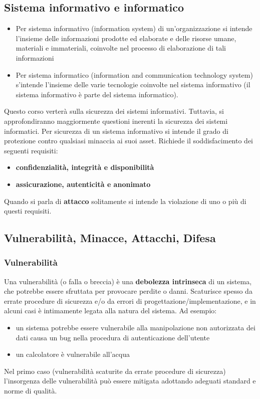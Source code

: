 \subsection{Sistema informativo e informatico}
\begin{itemize} 
  \item Per sistema informativo (information system) di un’organizzazione si intende l’insieme delle informazioni prodotte ed elaborate e delle risorse umane, materiali e immateriali, coinvolte nel processo di elaborazione di tali informazioni
  \item Per sistema informatico (information and communication technology system) s'intende l'insieme delle varie tecnologie coinvolte nel sistema informativo (il sistema informativo è parte del sistema informatico).
\end{itemize}
Questo corso verterà sulla sicurezza dei sistemi informativi. Tuttavia, si approfondiranno maggiormente questioni inerenti la sicurezza
dei sistemi informatici. Per sicurezza di un sistema informativo si intende il grado di protezione contro qualsiasi minaccia ai suoi asset.
Richiede il soddisfacimento dei seguenti requisiti:
\begin{itemize} 
  \item \textbf{confidenzialità, integrità e disponibilità}
  \item \textbf{assicurazione, autenticità e anonimato}
\end{itemize}
Quando si parla di \textbf{attacco} solitamente si intende la violazione di uno o più di questi requisiti.

\subsection{Vulnerabilità, Minacce, Attacchi, Difesa}
\subsubsection{Vulnerabilità}
Una vulnerabilità (o falla o breccia) è una \textbf{debolezza intrinseca} di un sistema, che potrebbe essere sfruttata per provocare perdite o danni. Scaturisce spesso da errate procedure di sicurezza e/o da errori di progettazione/implementazione, e  in alcuni casi è intimamente legata alla natura del sistema. Ad esempio:
\begin{itemize} 
  \item un sistema potrebbe essere vulnerabile alla manipolazione non autorizzata dei dati causa un bug nella procedura di autenticazione dell’utente
  \item un calcolatore è vulnerabile all'acqua
\end{itemize}
Nel primo caso (vulnerabilità scaturite da errate procedure di sicurezza) l'insorgenza delle vulnerabilità può essere mitigata adottando adeguati standard e norme di qualità.

